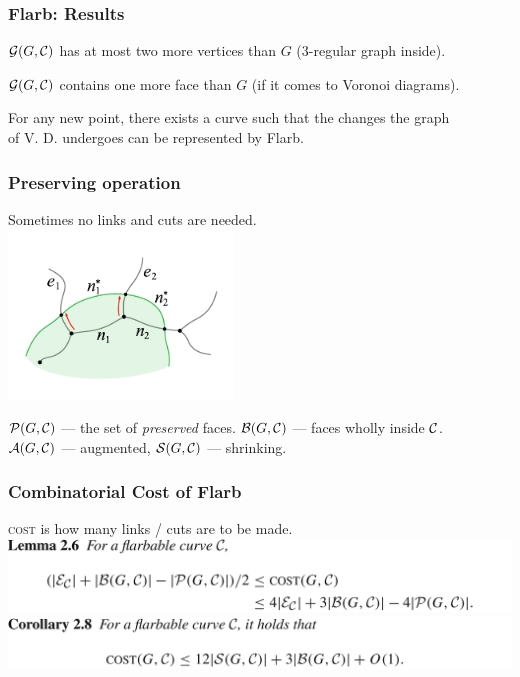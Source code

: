 \begin{frame} \frametitle{Flarb: Results}
\begin{theorem}
	$\mathcal G(G, \mathcal C)$ has at most two more vertices than $G$ (3-regular graph inside).
\end{theorem} \medskip
\begin{theorem}
	$\mathcal G(G, \mathcal C)$ contains one more face than $G$ (if it comes to Voronoi diagrams).
\end{theorem} \medskip
\begin{theorem}
	For any new point, there exists a curve such that the changes the graph \\
	of V. D. undergoes can be represented by Flarb.
\end{theorem}
\end{frame}

\begin{frame} \frametitle{Preserving operation}
\begin{center}
	Sometimes no links and cuts are needed. \\ \vspace{-0.15cm}
	\includegraphics[width=6cm]{flarb/4cost-free}
\end{center} \vspace{-0.6cm}

$\mathcal P(G,\mathcal C)$ — the set of {\it preserved} faces. $\mathcal B(G,\mathcal C)$ — faces wholly inside $\mathcal C$. \\
$\mathcal A(G,\mathcal C)$ — augmented, $\mathcal S(G,\mathcal C)$ — shrinking.
\end{frame}

\begin{frame} \frametitle{Combinatorial Cost of Flarb}
\begin{center}
	{\scshape cost} is how many links / cuts are to be made. \\ \vspace{0.8cm}
	\includegraphics[width=14cm]{figs/2-6.png} \\ \vspace{0.8cm}
	\includegraphics[width=14cm]{figs/2-8.png}
\end{center}
\end{frame}

